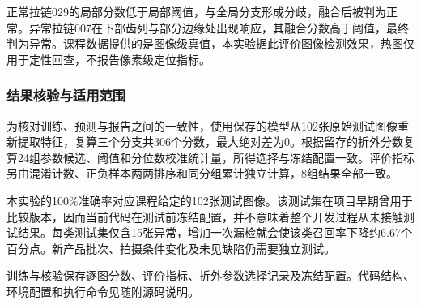 正常拉链029的局部分数低于局部阈值，与全局分支形成分歧，融合后被判为正常。异常拉链007在下部齿列与部分边缘处出现响应，其融合分数\ZipAbnormalScore 高于阈值\ZipThreshold，最终判为异常。课程数据提供的是图像级真值，本实验据此评价图像检测效果，热图仅用于定性回查，不报告像素级定位指标。

\subsubsection{结果核验与适用范围}
为核对训练、预测与报告之间的一致性，使用保存的模型从102张原始测试图像重新提取特征，复算三个分支共306个分数，最大绝对差为0。根据留存的折外分数复算24组参数候选、阈值和分位数校准统计量，所得选择与冻结配置一致。评价指标另由混淆计数、正负样本两两排序和同分组累计独立计算，8组结果全部一致。

本实验的100\%准确率对应课程给定的102张测试图像。该测试集在项目早期曾用于比较版本，因而当前代码在测试前冻结配置，并不意味着整个开发过程从未接触测试结果。每类测试集仅含15张异常，增加一次漏检就会使该类召回率下降约6.67个百分点。新产品批次、拍摄条件变化及未见缺陷仍需要独立测试。

训练与核验保存逐图分数、评价指标、折外参数选择记录及冻结配置。代码结构、环境配置和执行命令见随附源码说明。

